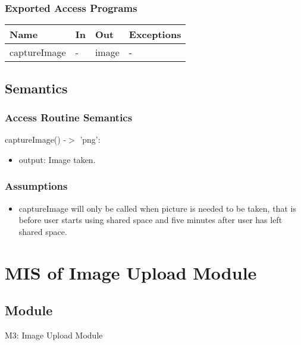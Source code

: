 \documentclass[12pt, titlepage]{article}
\begin{document}
\subsubsection{Exported Access Programs}

\begin{center}
\begin{tabular}{p{4cm} p{4cm} p{4cm} p{2cm}}
\hline
\textbf{Name} & \textbf{In} & \textbf{Out} & \textbf{Exceptions} \\
\hline
captureImage & - & image & - \\
\hline
\end{tabular}
\end{center}

\subsection{Semantics}

\subsubsection{Access Routine Semantics}

\noindent captureImage() -$>$ 'png':
\begin{itemize}
\item output: Image taken.
\end{itemize}

\subsubsection{Assumptions}
\begin{itemize}
\item captureImage will only be called when picture is needed to be taken, that is before user starts using shared space and five minutes after user has left shared space.
\end{itemize}


\newpage


\section{MIS of Image Upload Module} \label{Module} 

\subsection{Module}

M3: Image Upload Module
\end{document}

